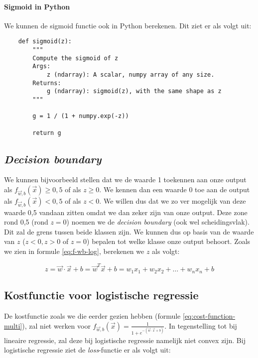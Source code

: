 \paragraph{Sigmoid in Python}

We kunnen de sigmoid functie ook in Python berekenen. Dit ziet er als volgt uit:
\begin{lstlisting}
	def sigmoid(z):
	    """
	    Compute the sigmoid of z
	    Args:
	        z (ndarray): A scalar, numpy array of any size.
	    Returns:
	        g (ndarray): sigmoid(z), with the same shape as z
	    """
	
	    g = 1 / (1 + numpy.exp(-z))
	
	    return g
\end{lstlisting}
\subsection{\textit{Decision boundary}}

We kunnen bijvoorbeeld stellen dat we de waarde 1 toekennen aan onze output als $f_{\vec{w},b}(\vec{x}) \geq 0,5$ of als $z \geq 0$. We kennen dan een waarde 0 toe aan de output als $f_{\vec{w},b}(\vec{x}) < 0,5$ of als $z < 0$. We willen dus dat we zo ver mogelijk van deze waarde 0,5 vandaan zitten omdat we dan zeker zijn van onze output. Deze zone rond 0,5 (rond $z = 0$) noemen we de \textit{decision boundary} (ook wel scheidingsvlak). Dit zal de grens tussen beide klassen zijn. We kunnen dus op basis van de waarde van $z$ ($z < 0, z > 0$ of $z = 0$) bepalen tot welke klasse onze output behoort. Zoals we zien in formule \ref{eq:f-wb-log}, berekenen we $z$ als volgt:

\begin{equation}
	z = \vec{w} \cdot \vec{x} + b = \vec{w}^{T}\vec{x} + b = w_{1}x_{1} + w_{2}x_{2} + \ldots + w_{n}x_{n} + b
\end{equation}

\subsection{Kostfunctie voor logistische regressie}

De kostfunctie zoals we die eerder gezien hebben (formule \ref{eq:cost-function-multi}), zal niet werken voor $f_{\vec{w},b}(\vec{x}) = \frac{1}{1 + e^{-(\vec{w} \cdot \vec{x} + b)}}$. In tegenstelling tot bij lineaire regressie, zal deze bij logistische regressie namelijk niet convex zijn. Bij logistische regressie ziet de \textit{loss}-functie er als volgt uit:

